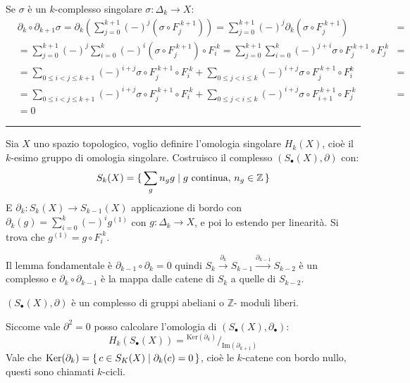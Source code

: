 \documentclass[10pt, twoside=false, x11names]{scrbook}
\newenvironment{proof}{{\textbf{Dimostrazione}:}}{\hfill\rule{2mm}{2mm} \newline}
\newcommand{\Z}{\mathbb{Z}}
\newcommand{\im}[1]{\mathrm{Im}( #1 )}
\renewcommand{\ker}[1]{\mathrm{Ker}( #1)}
\newcommand*\quot[2]{{^{\textstyle #1}\big/_{\textstyle #2}}}
\begin{document}
\begin{proof}
  Se $ \sigma $ è un $ k $-complesso singolare $ \sigma : \Delta_k \to X $:
  \begin{align*}
    & \partial_k \circ \partial_{k+1} \sigma = \partial_k \left( \sum_{j=0}^{k+1}(-)^j (\sigma \circ F_j^{\; k+1}) \right) =  \sum_{j=0}^{k+1}(-)^j \partial_k (\sigma \circ F_j^{\; k+1}) &= \\
                    & = \sum_{j=0}^{k+1} (-)^j \sum_{i=0}^k (-)^i (\sigma \circ F_j^{\; k+1}) \circ F_i^{\; k} = \sum_{j = 0}^{k+1} \sum_{i = 0}^{k} (-)^{j+i} \sigma \circ F_j^{\; k+1} \circ F_{j}^{\; k} &= \\
                    & = \sum_{0 \leq i < j \leq k + 1} (-)^{i+j} \sigma \circ F_j^{\; k+1} \circ F_i^{\; k} + \sum_{0 \leq j < i \leq k} (-)^{i+j} \sigma \circ F_j^{\; k+1} \circ F_i^k &= \\
    & = \sum_{0 \leq i < j \leq k + 1} (-)^{i+j} \sigma \circ F_j^{\; k+1} \circ F_i^{\; k} + \sum_{0 \leq j < i \leq k} (-)^{i+j} \sigma \circ F_{i+1}^{\; k+1} \circ F_j^{\; k} & =  \\
    & = 0
  \end{align*}
\end{proof}


Sia $ X $ uno spazio topologico, voglio definire l'omologia singolare $ H_k(X) $, cioè il $ k $-esimo gruppo di omologia
singolare. Costruisco il complesso $ (S_\bullet(X), \partial) $ con:
\[
  S_k(X) = \set{ \sum_g n_g g | g \text{ continua, } n_g \in \Z }
\]
E $ \partial_k : S_k(X) \to S_{k-1}(X) $ applicazione di bordo con $ \partial_k(g) = \sum_{i=0}^k(-)^ig^{(1)} $ con $ g: \Delta_k \to X $, e poi lo estendo per
linearità. Si trova che $ g^{(1)} = g \circ F_i^{\; k} $.

Il lemma fondamentale è $ \partial_{k-1} \circ \partial_k = 0 $ quindi $ S_k \overset{\partial_k}{\to} S_{k-1} \overset{\partial_{k-1}}{\to} S_{k-2} $ è un complesso
e $ \partial_k \circ \partial_{k-1} $ è la mappa dalle catene di $ S_k $ a quelle di $ S_{k-2} $.

$ (S_\bullet(X), \partial) $ è un complesso di gruppi abeliani o $ \Z $- moduli liberi.

Siccome vale $ \partial^2 = 0 $ posso calcolare l'omologia di $ (S_\bullet(X),\partial_\bullet) $:
\[
  H_k(S_\bullet(X)) = \quot{\ker{\partial_k}}{\im{\partial_{k+1}}}
\]
Vale che $ \ker{\partial_k} = \set{c \in S_K(X) | \partial_k(c) = 0} $, cioè le $ k $-catene con
bordo nullo, questi sono chiamati $ k $-cicli.
\end{document}
